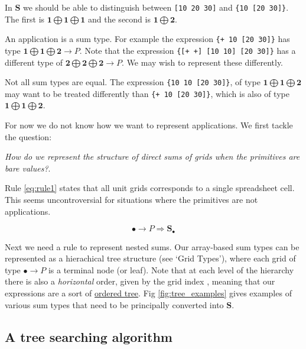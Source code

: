 \documentclass[11pt]{article}
\newcommand{\unit}{\bullet}
\newcommand{\one}{\mathbf{1}}
\newcommand{\two}{\mathbf{2}}
\newcommand{\cell}{\mathbf{S}_\bullet}
\begin{document}
In $\mathbf{S}$ we should be able to distinguish between \verb|[10 20 30]| and \verb|{10 [20 30]}|. The first is $\one \bigoplus \one \bigoplus \one$ and the second is $\one \bigoplus \two$. 

An application is a sum type. For example the expression \verb|{+ 10 [20 30]}| has type $\one \bigoplus \one \bigoplus \two \to P$. Note that the expression \verb|{[+ +] [10 10] [20 30]}| has a different type of $\two \bigoplus \two \bigoplus \two \to P$. We may wish to represent these differently. 

Not all sum types are equal. The expression \verb|{10 10 [20 30]}|,  of type $\one \bigoplus \one \bigoplus \two$ may want to be treated differently than \verb|{+ 10 [20 30]}|, which is also of type $\one \bigoplus \one \bigoplus \two$.

For now we do not know how we want to represent applications. We first tackle the question:


\textit{How do we represent the structure of direct sums of grids when the primitives are bare values?}. 

Rule \ref{eq:rule1} states that all unit grids corresponds to a single spreadsheet cell. This seems uncontroversial for situations where the primitives are not applications.

\begin{equation} 
\unit \to P \Rightarrow \cell \label{eq:rule1}
\end{equation}

Next we need a rule to represent nested sums. Our array-based sum types can be represented as a hierachical tree structure (see `Grid Types'), where each grid of type $\unit \to P$ is a terminal node (or leaf). Note that at each level of the hierarchy there is also a \textit{horizontal} order, given by the grid index , meaning that our expressions are a sort of \href{https://en.wikipedia.org/wiki/Tree_(data_structure)#Ordered_tree}{ordered tree}. Fig \ref{fig:tree_examples} gives examples of various sum types that need to be principally converted into $\mathbf{S}$.

\subsection{A tree searching algorithm}
\end{document}
